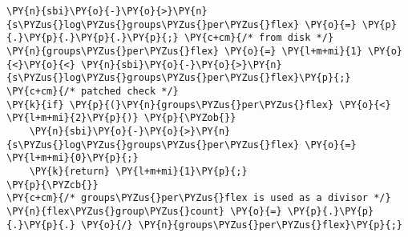 \begin{Verbatim}[commandchars=\\\{\},codes={\catcode`\$=3\catcode`\^=7\catcode`\_=8}]
\PY{n}{sbi}\PY{o}{-}\PY{o}{>}\PY{n}{s\PYZus{}log\PYZus{}groups\PYZus{}per\PYZus{}flex} \PY{o}{=} \PY{p}{.}\PY{p}{.}\PY{p}{.}\PY{p}{;} \PY{c+cm}{/* from disk */}
\PY{n}{groups\PYZus{}per\PYZus{}flex} \PY{o}{=} \PY{l+m+mi}{1} \PY{o}{<}\PY{o}{<} \PY{n}{sbi}\PY{o}{-}\PY{o}{>}\PY{n}{s\PYZus{}log\PYZus{}groups\PYZus{}per\PYZus{}flex}\PY{p}{;}
\PY{c+cm}{/* patched check */}
\PY{k}{if} \PY{p}{(}\PY{n}{groups\PYZus{}per\PYZus{}flex} \PY{o}{<} \PY{l+m+mi}{2}\PY{p}{)} \PY{p}{\PYZob{}}
    \PY{n}{sbi}\PY{o}{-}\PY{o}{>}\PY{n}{s\PYZus{}log\PYZus{}groups\PYZus{}per\PYZus{}flex} \PY{o}{=} \PY{l+m+mi}{0}\PY{p}{;}
    \PY{k}{return} \PY{l+m+mi}{1}\PY{p}{;}
\PY{p}{\PYZcb{}}
\PY{c+cm}{/* groups\PYZus{}per\PYZus{}flex is used as a divisor */}
\PY{n}{flex\PYZus{}group\PYZus{}count} \PY{o}{=} \PY{p}{.}\PY{p}{.}\PY{p}{.} \PY{o}{/} \PY{n}{groups\PYZus{}per\PYZus{}flex}\PY{p}{;}
\end{Verbatim}
